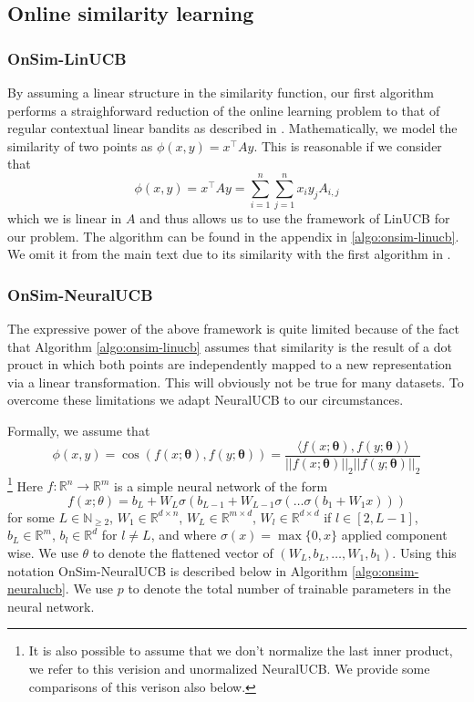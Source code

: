 \documentclass{article}
\begin{document}
\subsection{Online similarity learning}
\subsubsection{OnSim-LinUCB}
By assuming a linear structure in the similarity function, our first algorithm performs a straighforward reduction of the online learning problem to that of regular contextual linear bandits as described in \cite{linucb}.
Mathematically, we model the similarity of two points as  $\phi(x, y) = x^\top A y$.
This is reasonable if we consider that
\[\phi(x, y) = x^\top A y = \sum_{i =1}^n\sum_{j=1}^n x_i y_j A_{i,j} \]
which we is linear in $A$ and thus allows us to use the framework of LinUCB for our problem.
The algorithm can be found in the appendix in \ref{algo:onsim-linucb}. We omit it from the main text due to its similarity with the first algorithm in \cite{linucb}.


\subsubsection{OnSim-NeuralUCB}
The expressive power of the above framework is quite limited because of the fact that Algorithm \ref{algo:onsim-linucb} assumes that similarity is the result
of a dot prouct in which both points are independently mapped to a new representation via a linear transformation. This will obviously not be true for many datasets.
To overcome these limitations we adapt NeuralUCB \cite{neuralucb} to our circumstances.

Formally, we assume that
\[ \phi(x,y) = \cos\left(f(x;\mathbf{\theta}), f(y;\mathbf{\theta})\right) = \frac{\langle f(x;\mathbf{\theta}), f(y;\mathbf{\theta}) \rangle}{||f(x;\mathbf{\theta})||_2 ||f(y;\mathbf{\theta})||_2}\]
\footnote{It is also possible to assume that we don't normalize the last inner product, we refer to this verision and unormalized NeuralUCB. We provide some comparisons of this verison also below.}
Here $f: \mathbb{R}^n \to \mathbb{R}^m$ is a simple neural network of the form
\[ f(x; \theta) = b_L + W_{L} \sigma\left(b_{L-1} +  W_{L-1} \sigma\left( \dots \sigma\left(b_1 + W_1 x\right)\right) \right)\]
for some $L \in \mathbb{N}_{\geq 2}$, $W_1 \in \mathbb{R}^{d \times n}$, $W_{L} \in \mathbb{R}^{m \times d}$, $W_{l} \in \mathbb{R}^{d\times d}$ if $l \in [2, L-1]$, $b_L \in \mathbb{R}^m$, $b_l \in \mathbb{R}^d$ for $l \neq L$, and where $\sigma(x) = \max\{0, x\}$ applied component wise. We use $\theta$ to denote the flattened vector of $(W_L, b_L, \dots, W_1, b_1)$.
Using this notation OnSim-NeuralUCB is described below in Algorithm \ref{algo:onsim-neuralucb}. We use $p$ to denote the total number of trainable parameters in the neural network.
\end{document}
